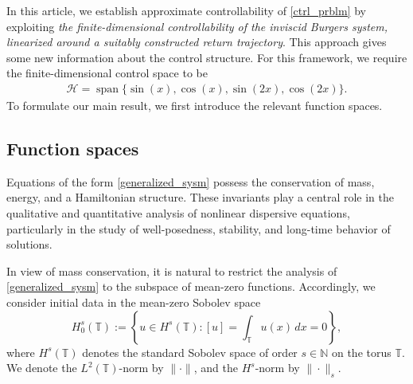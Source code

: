 \documentclass[10pt, reqno]{amsart}
\numberwithin{equation}{section}
\begin{document}
In this article, we establish approximate controllability of \eqref{ctrl_prblm} by exploiting \textit{the finite-dimensional controllability of the inviscid Burgers system, linearized around a suitably constructed return trajectory}. This approach gives some new information about the control structure. For this framework, we require the finite-dimensional control space to be
\begin{align}\label{defn_subspace_H}  
	\mathcal{H} = \operatorname{span} \{ \sin(x), \cos(x), \sin(2x), \cos(2x) \}.
\end{align}
To formulate our main result, we first introduce the relevant function spaces.

\subsection{Function spaces} Equations of the form \eqref{generalized_sysm} possess the conservation of mass, energy, and a Hamiltonian structure. These invariants play a central role in the qualitative and quantitative analysis of nonlinear dispersive equations, particularly in the study of well-posedness, stability, and long-time behavior of solutions.

In view of mass conservation, it is natural to restrict the analysis of \eqref{generalized_sysm} to the subspace of mean-zero functions. Accordingly, we consider initial data in the mean-zero Sobolev space
\[
H^s_0(\mathbb{T}) := \left\{ u \in H^s(\mathbb{T}) : [u] = \int_{\mathbb{T}} u(x) \, dx = 0 \right\},
\]
where \( H^s(\mathbb{T}) \) denotes the standard Sobolev space of order \( s \in \mathbb{N}\) on the torus \( \mathbb{T} \). We denote the \( L^2(\mathbb{T}) \)-norm by \( \| \cdot \| \), and the \( H^s \)-norm by \( \| \cdot \|_s \).
\end{document}
